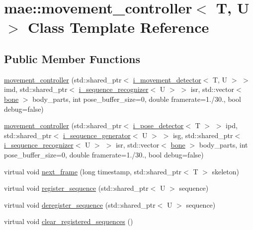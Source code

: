 \hypertarget{classmae_1_1movement__controller}{\section{mae\-:\-:movement\-\_\-controller$<$ T, U $>$ Class Template Reference}
\label{classmae_1_1movement__controller}
}
\subsection*{Public Member Functions}
\begin{DoxyCompactItemize}
\item 
\hyperlink{classmae_1_1movement__controller_a0a6d908fed45b190b0ce24faa879be47}{movement\-\_\-controller} (std\-::shared\-\_\-ptr$<$ \hyperlink{classmae_1_1i__movement__detector}{i\-\_\-movement\-\_\-detector}$<$ T, U $>$ $>$ imd, std\-::shared\-\_\-ptr$<$ \hyperlink{classmae_1_1i__sequence__recognizer}{i\-\_\-sequence\-\_\-recognizer}$<$ U $>$ $>$ isr, std\-::vector$<$ \hyperlink{classmae_1_1bone}{bone} $>$ body\-\_\-parts, int pose\-\_\-buffer\-\_\-size=0, double framerate=1./30., bool debug=false)
\item 
\hyperlink{classmae_1_1movement__controller_ac0ef0a57b48e4fb5f8c28168ea68f9e4}{movement\-\_\-controller} (std\-::shared\-\_\-ptr$<$ \hyperlink{classmae_1_1i__pose__detector}{i\-\_\-pose\-\_\-detector}$<$ T $>$ $>$ ipd, std\-::shared\-\_\-ptr$<$ \hyperlink{classmae_1_1i__sequence__generator}{i\-\_\-sequence\-\_\-generator}$<$ U $>$ $>$ isg, std\-::shared\-\_\-ptr$<$ \hyperlink{classmae_1_1i__sequence__recognizer}{i\-\_\-sequence\-\_\-recognizer}$<$ U $>$ $>$ isr, std\-::vector$<$ \hyperlink{classmae_1_1bone}{bone} $>$ body\-\_\-parts, int pose\-\_\-buffer\-\_\-size=0, double framerate=1./30., bool debug=false)
\item 
virtual void \hyperlink{classmae_1_1movement__controller_aa153304725199cb7d4664a0f450ec934}{next\-\_\-frame} (long timestamp, std\-::shared\-\_\-ptr$<$ T $>$ skeleton)
\item 
virtual void \hyperlink{classmae_1_1movement__controller_a67781bb43d01fcecfd4ab7c70c670bb9}{register\-\_\-sequence} (std\-::shared\-\_\-ptr$<$ U $>$ sequence)
\item 
virtual void \hyperlink{classmae_1_1movement__controller_a6b4bf0e71ad1c66fbea6cdae2913ef84}{deregister\-\_\-sequence} (std\-::shared\-\_\-ptr$<$ U $>$ sequence)
\item 
virtual void \hyperlink{classmae_1_1movement__controller_ac1fd2fc2b97bbc404e08f535647c47e9}{clear\-\_\-registered\-\_\-sequences} ()

\end{DoxyCompactItemize}
